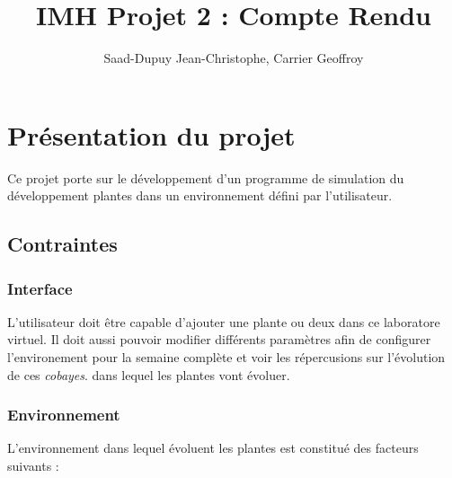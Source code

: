 \documentclass[a4paper,10pt]{article}
\title{IMH Projet 2 : Compte Rendu}
\author{Saad-Dupuy Jean-Christophe, Carrier Geoffroy}
\begin{document}
\maketitle



\section{Présentation du projet}
Ce projet porte sur le développement d'un programme de simulation du développement plantes dans un environnement défini par l'utilisateur.
\subsection{Contraintes}
\subsubsection{Interface}
L'utilisateur doit être capable d'ajouter une plante ou deux dans ce laboratore virtuel.
Il doit aussi pouvoir modifier différents paramètres afin de configurer l'environement pour
la semaine complète et voir les répercusions sur l'évolution de ces \textit{cobayes}.
dans lequel les plantes vont évoluer.

\subsubsection{Environnement}
L'environnement dans lequel évoluent les plantes est constitué des facteurs suivants :
\end{document}
